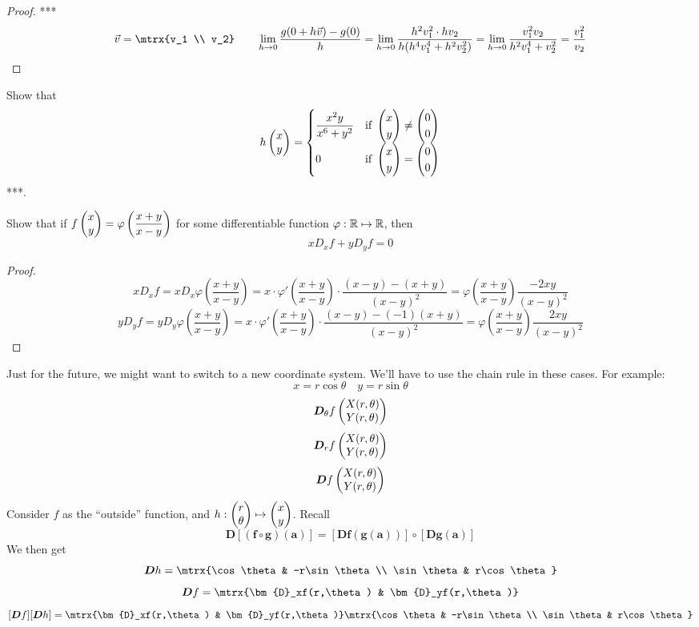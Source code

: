 \begin{proof}
  ***
  \[\vec{v}=\mtrx{v_1 \\ v_2}\qquad \lim_{h\to 0}\frac{g(0+h\vec{v})-g(0)}{h}=\lim_{h\to 0} \frac{h^2v_1^2\cdot hv_2}{h(h^4v_1^4 + h^2 v_2^2)}=\lim_{h\to 0} \frac{v_1^2 v_2}{h^2v_1^4 + v_2^2}=\frac{v_1^2}{v_2}\]
\end{proof}

Show that
\[h\begin{pmatrix} x \\ y \end{pmatrix} = \begin{cases}
\displaystyle \frac{x^2 y}{x^6+y^2} & \text{if } \begin{pmatrix} x \\ y \end{pmatrix} \neq \begin{pmatrix} 0 \\ 0 \end{pmatrix} \\
0 & \text{if } \begin{pmatrix} x \\ y \end{pmatrix} = \begin{pmatrix} 0 \\ 0 \end{pmatrix}
\end{cases}\]
***.

Show that if $\displaystyle f\begin{pmatrix} x \\ y \end{pmatrix}=\varphi\left( \frac{x+y}{x-y} \right)$ for some differentiable function $\varphi : \mathbb{R} \mapsto \mathbb{R}$, then
\[xD_xf + yD_yf = 0\]
\begin{proof}
  \[xD_xf = xD_x \varphi\left(\frac{x+y}{x-y}\right)=x\cdot \varphi'\left(\frac{x+y}{x-y}\right)\cdot \frac{(x-y)-(x+y)}{(x-y)^2}=\varphi\left(\frac{x+y}{x-y}\right)\frac{-2xy}{(x-y)^2}\]
  \[yD_yf = yD_y \varphi\left(\frac{x+y}{x-y}\right)=x\cdot \varphi'\left(\frac{x+y}{x-y}\right)\cdot \frac{(x-y)-(-1)(x+y)}{(x-y)^2}=\varphi\left(\frac{x+y}{x-y}\right)\frac{2xy}{(x-y)^2}\]
\end{proof}

Just for the future, we might want to switch to a new coordinate system. We'll have to use the chain rule in these cases. For example:
\[x=r\cos{\theta} \quad y=r\sin{\theta}\]
\[\bm{D}_\theta f\begin{pmatrix} X(r,\theta) \\ Y(r, \theta) \end{pmatrix}\]
\[\bm{D}_r f\begin{pmatrix} X(r,\theta) \\ Y(r, \theta) \end{pmatrix}\]
\[\bm{D} f\begin{pmatrix} X(r,\theta) \\ Y(r, \theta) \end{pmatrix}\]
Consider $f$ as the ``outside'' function, and $h : \begin{pmatrix} r \\ \theta \end{pmatrix}\mapsto \begin{pmatrix} x \\ y \end{pmatrix}$. Recall
\[\bm{D}[(\bm{f}\circ \bm{g})(\bm{a})]=[\bm{Df} (\bm{g}(\bm{a}))]\circ [\bm{Dg}(\bm{a})]\]
We then get
\[\bm{D}h = \mtrx{\cos\theta & -r\sin\theta \\ \sin\theta & r\cos\theta}\]
\[\bm{D}f = \mtrx{\bm{D}_xf(r,\theta) & \bm{D}_yf(r,\theta)}\]
\[[\bm{D}f][\bm{D}h]=\mtrx{\bm{D}_xf(r,\theta) & \bm{D}_yf(r,\theta)}\mtrx{\cos\theta & -r\sin\theta \\ \sin\theta & r\cos\theta}\]

